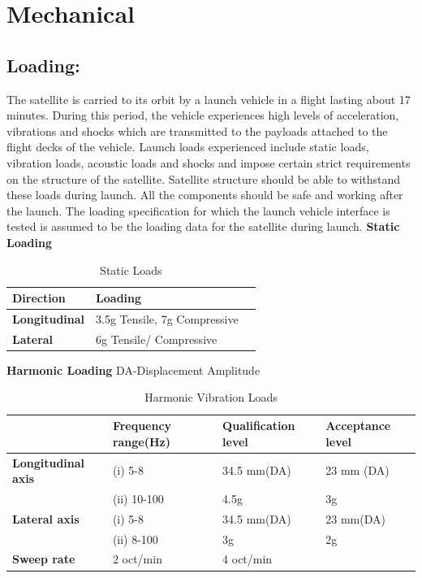 \documentclass[../../main.tex]{subfiles}
\begin{document}
\section{Mechanical}
\subsection{Loading:}
The satellite is carried to its orbit by a launch vehicle in a flight lasting about 17 minutes.
During this period, the vehicle experiences high levels of acceleration, vibrations and
shocks which are transmitted to the payloads attached to the flight decks of the vehicle.
Launch loads experienced include static loads, vibration loads, acoustic loads and shocks
and impose certain strict requirements on the structure of the satellite. Satellite structure
should be able to withstand these loads during launch. All the components should be
safe and working after the launch. The loading specification for which the launch vehicle
interface is tested is assumed to be the loading data for the satellite during launch. \newline
\newline
    \textbf{Static Loading}

\begin{table}[H]
    \centering
    \begin{tabular}{ |p{3cm} | p{6cm} | p{3cm} | }
    \hline
    \textbf{Direction} & \textbf{Loading} \\
    \hline
    \textbf{Longitudinal} & 3.5g Tensile, 7g Compressive \\
    \hline
    \textbf{Lateral} & 6g Tensile/ Compressive \\
    \hline
    \end{tabular}
    \caption{Static Loads}
    \label{tab:my_label}
\end{table}

\textbf{Harmonic Loading}
\newline
DA-Displacement Amplitude
\begin{table}[H]
    \centering
    \begin{tabular}{ |p{3.5cm}|p{3.5cm}|p{3.3cm}|p{3.3cm}| }
 \hline
     & \textbf{Frequency range(Hz)} & \textbf{Qualification level} &\textbf{Acceptance level} \\
     \hline
\textbf{Longitudinal axis} & (i) 5-8 & 34.5 mm(DA)  & 23 mm (DA) \\
     \hline
 & (ii) 10-100 & 4.5g & 3g \\
 \hline
 \textbf{Lateral axis} & (i) 5-8 & 34.5 mm(DA) & 23 mm(DA) \\
 \hline
 & (ii) 8-100 & 3g & 2g \\
 \hline
\textbf{Sweep rate} & 2 oct/min & 4 oct/min &  \\
 \hline
 \end{tabular}
    \caption{Harmonic Vibration Loads}
    \label{tab:my_label}
\end{table}
\end{document}

